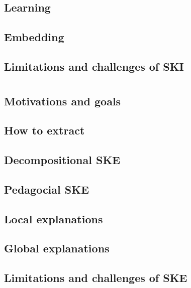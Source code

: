 \subsection{Learning}\label{subsec:learning}

\subsection{Embedding}\label{subsec:ski-embedding}

\subsection[Limitations and challenges of SKI]{Limitations and challenges of \Gls{SKI}}\label{subsec:limitations-and-challenges-of-ski}

\section[Symbolic knowledge extraction]{}\label{sec:ske}

\subsection{Motivations and goals}\label{subsec:ske-motivations-and-goals}

\subsection{How to extract}\label{subsec:how-to-extract}

\subsection[Decompositional SKE]{Decompositional \Gls{SKE}}\label{subsec:decompositional-ske}

\subsection[Pedagocial SKE]{Pedagocial \Gls{SKE}}\label{subsec:pedagogical-ske}

\subsection{Local explanations}\label{subsec:local-explanations}

\subsection{Global explanations}\label{subsec:global-explanations}

\subsection[Limitations and challenges of SKE]{Limitations and challenges of \Gls{SKE}}\label{subsec:limitations-and-challenges-of-ske}